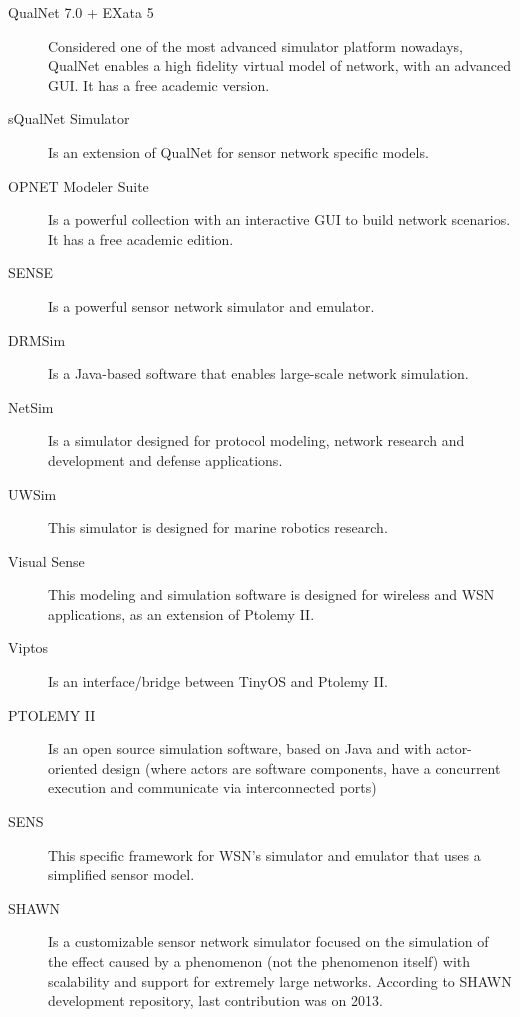\begin{description}
	\item [QualNet 7.0 + EXata 5] 
	Considered one of the most advanced simulator platform nowadays, QualNet enables a high fidelity virtual model of network, with an advanced GUI. It has a free academic version.

	\item [sQualNet Simulator] 
	Is an extension of QualNet for sensor network specific models. 

	\item [OPNET Modeler Suite] 
	Is a powerful collection with an interactive GUI to build network scenarios. It has a free academic edition. 

	\item [SENSE] 
	Is a powerful sensor network simulator and emulator.

	\item [DRMSim] 
	Is a Java-based software that enables large-scale network simulation.

	\item [NetSim] 
	Is a simulator designed for protocol modeling, network research and development and defense applications.

	\item [UWSim] 
	This simulator is designed for marine robotics research.

	\item [Visual Sense] 
	This modeling and simulation software is designed for wireless and WSN applications, as an extension of Ptolemy II.

	\item [Viptos] 
	Is an interface/bridge between TinyOS and Ptolemy II.

	\item [PTOLEMY II] 
	Is an open source simulation software, based on Java and with actor-oriented design (where actors are software components, have a concurrent execution and communicate via interconnected ports)
	
	\item [SENS] 
	This specific framework for WSN's simulator and emulator that uses a simplified sensor model.
	
	\item [SHAWN]	
	Is a customizable sensor network simulator focused on the simulation of the effect caused by a phenomenon (not the phenomenon itself) with scalability and support for extremely large networks. According to SHAWN development repository, last contribution was on 2013.
		

\end{description}
